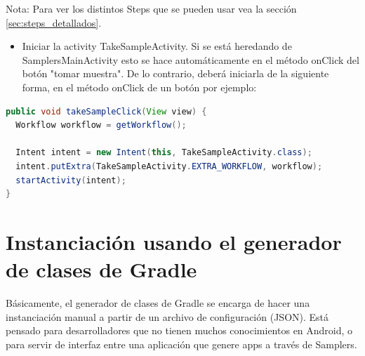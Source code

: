 Nota: Para ver los distintos Steps que se pueden usar vea la sección \ref{sec:steps_detallados}.

\begin{itemize}
	\item Iniciar la activity TakeSampleActivity. Si se está heredando de SamplersMainActivity esto se hace automáticamente en el método onClick del botón "tomar muestra". De lo contrario, deberá iniciarla de la siguiente forma, en el método onClick de un botón por ejemplo:
\end{itemize}

\begin{lstlisting}[language=Java, frame=tlbr, caption=Ejemplo de como iniciar la activity TakeSampleActivity.]
public void takeSampleClick(View view) {
  Workflow workflow = getWorkflow();

  Intent intent = new Intent(this, TakeSampleActivity.class);        
  intent.putExtra(TakeSampleActivity.EXTRA_WORKFLOW, workflow);
  startActivity(intent);
}		
\end{lstlisting}




\section{Instanciación usando el  generador de clases de Gradle} \label{sec:instanciacion_gradle}

Básicamente, el generador de clases de Gradle se encarga de hacer una instanciación manual a partir de un archivo de configuración (JSON). Está pensado para desarrolladores que no tienen muchos conocimientos en Android, o para servir de interfaz entre una aplicación que genere apps a través de Samplers.

